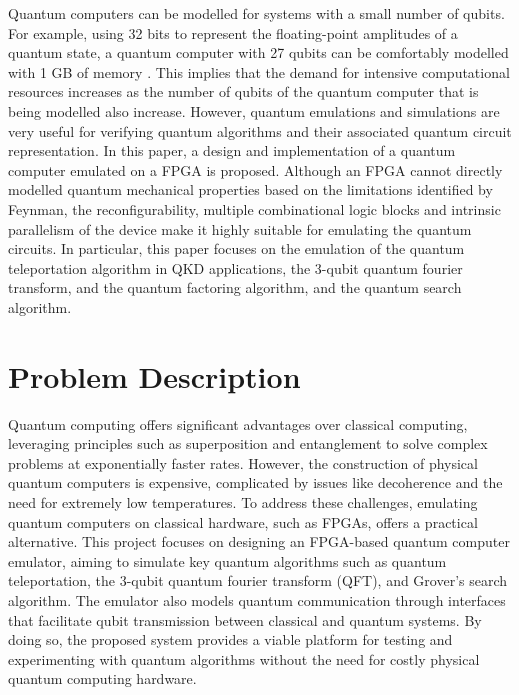 Quantum computers can be modelled for systems with a small number of qubits. For example, using 32 bits to represent the floating-point amplitudes of a quantum state, a quantum computer with 27 qubits can be comfortably modelled with 1 GB of memory \cite{brown2010using}. This implies that the demand for intensive computational resources increases as the number of qubits of the quantum computer that is being modelled also increase. However, quantum emulations and simulations are very useful for verifying quantum algorithms and their associated quantum circuit representation. In this paper, a design and implementation of a quantum computer emulated on a FPGA is proposed. Although an FPGA cannot directly modelled quantum mechanical properties based on the limitations identified by Feynman, the reconfigurability, multiple combinational logic blocks and intrinsic parallelism of the device make it highly suitable for emulating the quantum circuits. In particular, this paper focuses on the emulation of the quantum teleportation algorithm in QKD applications, the 3-qubit quantum fourier transform, and the quantum factoring algorithm, and the quantum search algorithm.

\section{\label{sec:probdesc}Problem Description}

Quantum computing offers significant advantages over classical computing, leveraging principles such as superposition and entanglement to solve complex problems at exponentially faster rates. However, the construction of physical quantum computers is expensive, complicated by issues like decoherence and the need for extremely low temperatures. To address these challenges, emulating quantum computers on classical hardware, such as FPGAs, offers a practical alternative. This project focuses on designing an FPGA-based quantum computer emulator, aiming to simulate key quantum algorithms such as quantum teleportation, the 3-qubit quantum fourier transform (QFT), and Grover's search algorithm. The emulator also models quantum communication through interfaces that facilitate qubit transmission between classical and quantum systems. By doing so, the proposed system provides a viable platform for testing and experimenting with quantum algorithms without the need for costly physical quantum computing hardware.


